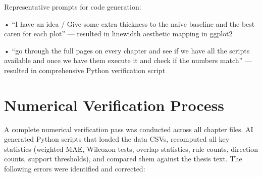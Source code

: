 Representative prompts for code generation:

•  ``I have an idea / Give some extra thickness to the naive baseline and the best caren for each plot'' --- resulted in linewidth aesthetic mapping in ggplot2

•  ``go through the full pages on every chapter and see if we have all the scripts available and once we have them execute it and check if the numbers match'' --- resulted in comprehensive Python verification script


\section{Numerical Verification Process}\label{app_sec:numerical_verification_process}

A complete numerical verification pass was conducted across all chapter files. AI generated Python scripts that loaded the data CSVs, recomputed all key statistics (weighted MAE, Wilcoxon tests, overlap statistics, rule counts, direction counts, support thresholds), and compared them against the thesis text. The following errors were identified and corrected:

